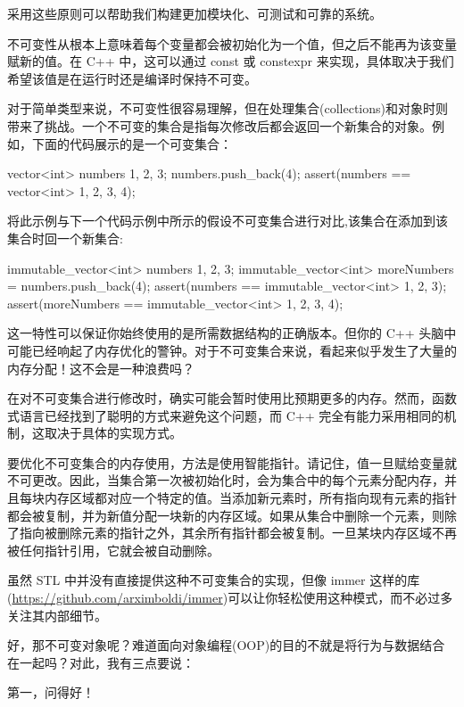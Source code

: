 采用这些原则可以帮助我们构建更加模块化、可测试和可靠的系统。


不可变性从根本上意味着每个变量都会被初始化为一个值，但之后不能再为该变量赋新的值。在 C++ 中，这可以通过 const 或 constexpr 来实现，具体取决于我们希望该值是在运行时还是编译时保持不可变。

对于简单类型来说，不可变性很容易理解，但在处理集合(collections)和对象时则带来了挑战。一个不可变的集合是指每次修改后都会返回一个新集合的对象。例如，下面的代码展示的是一个可变集合：

\begin{cpp}
vector<int> numbers {1, 2, 3};
numbers.push_back(4);
assert(numbers == vector<int> {1, 2, 3, 4});
\end{cpp}

将此示例与下一个代码示例中所示的假设不可变集合进行对比,该集合在添加到该集合时回一个新集合:

\begin{cpp}
immutable_vector<int> numbers {1, 2, 3};
immutable_vector<int> moreNumbers = numbers.push_back(4);
assert(numbers == immutable_vector<int> {1, 2, 3});
assert(moreNumbers == immutable_vector<int> {1, 2, 3, 4});
\end{cpp}

这一特性可以保证你始终使用的是所需数据结构的正确版本。但你的 C++ 头脑中可能已经响起了内存优化的警钟。对于不可变集合来说，看起来似乎发生了大量的内存分配！这不会是一种浪费吗？

在对不可变集合进行修改时，确实可能会暂时使用比预期更多的内存。然而，函数式语言已经找到了聪明的方式来避免这个问题，而 C++ 完全有能力采用相同的机制，这取决于具体的实现方式。

要优化不可变集合的内存使用，方法是使用智能指针。请记住，值一旦赋给变量就不可更改。因此，当集合第一次被初始化时，会为集合中的每个元素分配内存，并且每块内存区域都对应一个特定的值。当添加新元素时，所有指向现有元素的指针都会被复制，并为新值分配一块新的内存区域。如果从集合中删除一个元素，则除了指向被删除元素的指针之外，其余所有指针都会被复制。一旦某块内存区域不再被任何指针引用，它就会被自动删除。

虽然 STL 中并没有直接提供这种不可变集合的实现，但像 immer 这样的库(\url{https://github.com/arximboldi/immer})可以让你轻松使用这种模式，而不必过多关注其内部细节。

好，那不可变对象呢？难道面向对象编程(OOP)的目的不就是将行为与数据结合在一起吗？对此，我有三点要说：

第一，问得好！

